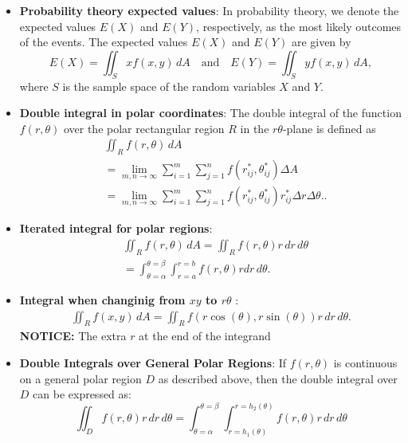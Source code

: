 \documentclass{report}
\begin{document}
\begin{itemize}
        \item \textbf{Probability theory expected values}:
            In probability theory, we denote the expected values \(E(X)\) and \(E(Y)\), respectively, as the most likely outcomes of the events. The expected values \(E(X)\) and \(E(Y)\) are given by
            \[
                E(X) = \iint_S x f(x,y) \, dA \quad \text{and} \quad E(Y) = \iint_S y f(x,y) \, dA,
            \]
            where \(S\) is the sample space of the random variables \(X\) and \(Y\).
        \item \textbf{Double integral in polar coordinates}:
            The double integral of the function $f(r,\theta)$ over the polar rectangular region $R$ in the $r\theta$-plane is defined as
            \begin{align*}
                &\iint_R f(r,\theta) \, dA  \\
                &= \lim_{m,n \to \infty} \sum_{i=1}^{m} \sum_{j=1}^{n} f(r^*_{ij}, \theta^*_{ij}) \Delta A  \\
                &= \lim_{m,n \to \infty} \sum_{i=1}^{m} \sum_{j=1}^{n} f(r^*_{ij}, \theta^*_{ij}) r^*_{ij} \Delta r \Delta \theta.
            .\end{align*}
        \item \textbf{Iterated integral for polar regions}:
            \begin{align*}
                &\iint_R f(r,\theta )\, dA = \iint_R f(r,\theta )r \, dr \, d\theta \\
                &=\int_{\theta =\alpha}^{\theta =\beta} \int_{r=a}^{r=b}f(r,\theta )r dr\, d\theta 
            .\end{align*}
        \item \textbf{Integral when changinig from $xy$ to $r\theta$ }:
            \begin{align*}
                \iint_R f(x,y)\, dA = \iint_R f(r\cos{\left(\theta \right)}, r\sin{\left(\theta \right)})r\, dr\, d\theta 
            .\end{align*}
            \textbf{NOTICE:} The extra $r$ at the end of the integrand
        \item \textbf{Double Integrals over General Polar Regions}:
            If $f(r,\theta)$ is continuous on a general polar region $D$ as described above, then the double integral over $D$ can be expressed as:
            \[
                \iint_D f(r,\theta) r \, dr \, d\theta = \int_{\theta=\alpha}^{\theta=\beta} \int_{r=h_1(\theta)}^{r=h_2(\theta)} f(r,\theta) r \, dr \, d\theta
            \]

\end{itemize}
\end{document}
